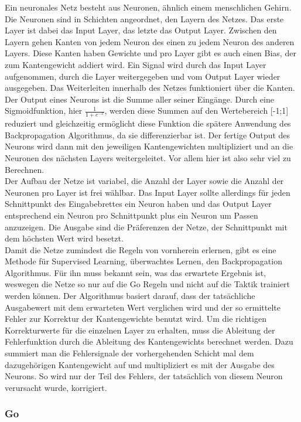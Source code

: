 \documentclass[12pt,a4paper]{article}
\begin{document}
Ein neuronales Netz besteht aus Neuronen, ähnlich einem menschlichen Gehirn. Die Neuronen sind in Schichten angeordnet, den Layern des Netzes. Das erste Layer ist dabei das Input Layer, das letzte das Output Layer. Zwischen den Layern gehen Kanten von jedem Neuron des einen zu jedem Neuron des anderen Layers. Diese Kanten haben Gewichte und pro Layer gibt es auch einen Bias, der zum Kantengewicht addiert wird. Ein Signal wird durch das Input Layer aufgenommen, durch die Layer weitergegeben und vom Output Layer wieder ausgegeben. Das Weiterleiten innerhalb des Netzes funktioniert über die Kanten. Der Output eines Neurons ist die Summe aller seiner Eingänge. Durch eine Sigmoidfunktion, hier $\frac{1}{1 + e^{-x}}$, werden diese Summen auf den Wertebereich [-1;1] reduziert und gleichzeitig ermöglicht diese Funktion die spätere Anwendung des Backpropagation Algorithmus, da sie differenzierbar ist. Der fertige Output des Neurons wird dann mit den jeweiligen Kantengewichten multipliziert und an die Neuronen des nächsten Layers weitergeleitet. Vor allem hier ist also sehr viel zu Berechnen. 
\\ 
Der Aufbau der Netze ist variabel, die Anzahl der Layer sowie die Anzahl der Neuronen pro Layer ist frei wählbar. Das Input Layer sollte allerdings für jeden Schnittpunkt des Eingabebrettes ein Neuron haben und das Output Layer entsprechend ein Neuron pro Schnittpunkt plus ein Neuron um Passen anzuzeigen. Die Ausgabe sind die Präferenzen der Netze, der Schnittpunkt mit dem höchsten Wert wird besetzt. 
\\
Damit die Netze zumindest die Regeln von vornherein erlernen, gibt es eine Methode für Supervised Learning, überwachtes Lernen, den Backpropagation Algorithmus. Für ihn muss bekannt sein, was das erwartete Ergebnis ist, weswegen die Netze so nur auf die Go Regeln und nicht auf die Taktik trainiert werden können. Der Algorithmus basiert darauf, dass der tatsächliche Ausgabewert mit dem erwarteten Wert verglichen wird und der so ermittelte Fehler zur Korrektur der Kantengewichte benutzt wird. Um die richtigen Korrekturwerte für die einzelnen Layer zu erhalten, muss die Ableitung der Fehlerfunktion durch die Ableitung des Kantengewichts berechnet werden. Dazu summiert man die Fehlersignale der vorhergehenden Schicht mal dem dazugehörigen Kantengewicht auf und multipliziert es mit der Ausgabe des Neurons. So wird nur der Teil des Fehlers, der tatsächlich von diesem Neuron verursacht wurde, korrigiert. 

\subsubsection{Go}
\end{document}
